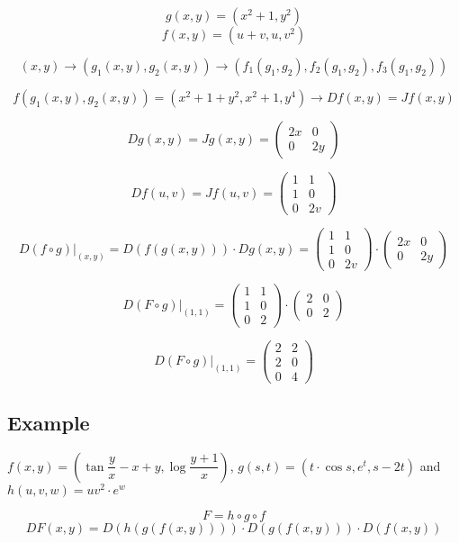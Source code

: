 \documentclass[11pt]{article}
\begin{document}
\[
g(x, y) = (x^2 + 1, y^2)
\]
\[
f(x, y) = (u + v, u, v^2)
\]

\[
(x, y) \rightarrow \left(g_1(x,y), g_2(x,y)\right) \rightarrow \left(f_1(g_1, g_2), f_2(g_1, g_2), f_3(g_1, g_2)\right)
\]

\[
f(g_1(x,y), g_2(x,y)) = (x^2 + 1 + y^2, x^2 + 1, y^4) \rightarrow Df(x, y) = Jf(x, y)
\]

\[
Dg(x, y) = Jg(x, y) = \begin{pmatrix}
2x & 0 \\
0 & 2y
\end{pmatrix}
\]

\[
Df(u, v) = Jf(u, v) = \begin{pmatrix}
1 & 1 \\
1 & 0 \\
0 & 2v
\end{pmatrix}
\]

\[
D(f \circ g)\big|_{(x, y)} = D(f(g(x, y))) \cdot Dg(x, y) = \begin{pmatrix}
1 & 1 \\
1 & 0 \\
0 & 2v
\end{pmatrix} \cdot \begin{pmatrix}
2x & 0 \\
0 & 2y
\end{pmatrix}
\]

\[
D(F \circ g)\big|_{(1, 1)} = \begin{pmatrix}
1 & 1 \\
1 & 0 \\
0 & 2
\end{pmatrix} \cdot \begin{pmatrix}
2 & 0 \\
0 & 2
\end{pmatrix}
\]

\[
D(F \circ g)\big|_{(1, 1)} = \begin{pmatrix}
2 & 2 \\
2 & 0 \\
0 & 4
\end{pmatrix}
\]

\subsection*{Example}
\( f(x,y) = \left( \tan \dfrac{y}{x} - x + y, \log \dfrac{y+1}{x} \right) \), \( g(s,t) = \left( t \cdot \cos s, e^t, s - 2t \right) \) and \( h(u, v, w) = uv^2 \cdot e^w \)

\[
F = h \circ g \circ f
\]
\[
DF(x, y) = D(h(g(f(x, y)))) \cdot D(g(f(x, y))) \cdot D(f(x, y))
\]
\end{document}
